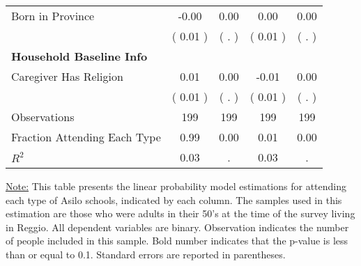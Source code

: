 \begin{table}[H]
{\begin{tabular}{lcccc}
\quad Born in Province &     -0.00 &      0.00 &      0.00 &      0.00 \\
\quad  & (     0.01 ) & (        . )  & (     0.01 )  & (        . )  \\
\midrule
\textbf{Household Baseline Info} \\
\quad Caregiver Has Religion &      0.01 &      0.00 &     -0.01 &      0.00 \\
\quad  & (     0.01 ) & (        . )  & (     0.01 )  & (        . )  \\
\midrule
Observations & 199 & 199 & 199 & 199 \\
Fraction Attending Each Type &      0.99 &      0.00 &      0.01 &      0.00 \\
\midrule
$ R^2$ &      0.03 &         . &      0.03 &         . \\
\bottomrule
\end{tabular}}
\end{table}
\begin{scriptsize}
\noindent\underline{Note:} This table presents the linear probability model estimations for attending each type of Asilo schools, indicated by each column. The samples used in this estimation are those who were adults in their 50's at the time of the survey living in Reggio. All dependent variables are binary. Observation indicates the number of people included in this sample. Bold number indicates that the p-value is less than or equal to 0.1. Standard errors are reported in parentheses.
\end{scriptsize}

